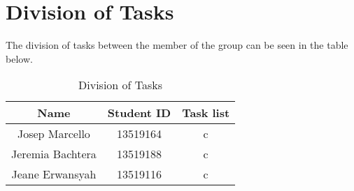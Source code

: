 \section*{Division of Tasks}

The division of tasks between the member of the group can be seen in the table
below.

\begin{table}[htbp]
	\caption{Division of Tasks}
	\begin{center}
		\begin{tabular}{|c c|c|}
			\hline
			\textbf{Name}    & \textbf{Student ID} & \textbf{Task list} \\
			\hline
			Josep Marcello   & 13519164            & c                  \\
			Jeremia Bachtera & 13519188            & c                  \\
			Jeane Erwansyah  & 13519116            & c                  \\
			\hline
		\end{tabular}
		\label{tab-divsion-of-task}
	\end{center}
\end{table}